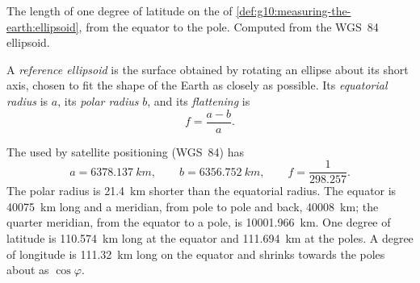 \begin{omfigure}

{\small The length of one degree of latitude on the  of
\cref{def:g10:measuring-the-earth:ellipsoid}, from the equator to the pole.
Computed from the WGS~84 ellipsoid.}
\end{omfigure}

\begin{definition}\label{def:g10:measuring-the-earth:ellipsoid}
A \emph{reference ellipsoid} is the surface
obtained by rotating an ellipse about its short axis, chosen to fit the
shape of the Earth as closely as possible. Its \emph{equatorial radius} is
$a$, its \emph{polar radius} $b$, and its
\emph{flattening} is
\[
  f = \frac{a-b}{a}.
\]
\end{definition}

\begin{proposition}\label{prop:g10:measuring-the-earth:dimensions}
The  used by satellite positioning (WGS~84) has
\[
  a = \qty{6378.137}{km}, \qquad b = \qty{6356.752}{km}, \qquad
  f = \frac{1}{298.257}.
\]
The polar radius is \qty{21.4}{km} shorter than the equatorial radius. The
equator is \qty{40075}{km} long and a meridian, from pole to pole and back,
\qty{40008}{km}; the quarter meridian, from the equator to a pole, is
\qty{10001.966}{km}. One degree of latitude is \qty{110.574}{km} long at the
equator and \qty{111.694}{km} at the poles. A degree of longitude is
\qty{111.32}{km} long on the equator and shrinks towards the poles about as
$\cos \varphi$.
\end{proposition}


